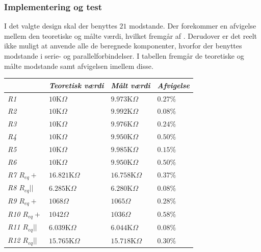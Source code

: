 \subsubsection{Implementering og test}
I det valgte design skal der benyttes $21$ modstande. Der forekommer en afvigelse mellem den teoretiske og målte værdi, hvilket fremgår af . Derudover er det reelt ikke muligt at anvende alle de beregnede komponenter, hvorfor der benyttes modstande i serie- og parallelforbindelser. I tabellen fremgår de teoretiske og målte modstande samt afvigelsen imellem disse. 
\begin{table}[H]
\centering
\begin{tabular}{|l|l|l|l|}
\cline{2-4} \multicolumn{1}{l|}{}     & \textit{Teoretisk værdi} & \textit{Målt værdi} & \textit{Afvigelse} \\ \hline
\textit{R1}             & $10$K$\Omega$            & $9.973$K$\Omega$    & $0.27\%$           \\ \hline
\textit{R2}             & $10$K$\Omega$            & $9.992$K$\Omega$    & $0.08\%$           \\ \hline
\textit{R3}             & $10$K$\Omega$            & $9.976$K$\Omega$    & $0.24\%$           \\ \hline
\textit{R4}             & $10$K$\Omega$            & $9.950$K$\Omega$    & $0.50\%$           \\ \hline
\textit{R5}             & $10$K$\Omega$            & $9.985$K$\Omega$    & $0.15\%$           \\ \hline
\textit{R6}             & $10$K$\Omega$            & $9.950$K$\Omega$    & $0.50\%$           \\ \hline
\textit{R7 $R_{eq}+$}     & $16.821$K$\Omega$        & $16.758$K$\Omega$   & $0.37\%$           \\ \hline
\textit{R8 $R_{eq}||$}  & $6.285$K$\Omega$         & $6.280$K$\Omega$    & $0.08\%$           \\ \hline
\textit{R9 $R_{eq}+$}     & $1068\Omega$             & $1065\Omega$        & $0.28\%$           \\ \hline
\textit{R10 $R_{eq}+$}    & $1042\Omega$             & $1036\Omega$        & $0.58\%$           \\ \hline
\textit{R11 $R_{eq}||$} & $6.039$K$\Omega$         & $6.044$K$\Omega$    & $0.08\%$           \\ \hline
\textit{R12 $R_{eq}||$} & $15.765$K$\Omega$        & $15.718$K$\Omega$   & $0.30\%$           \\ \hline

\end{tabular}
\end{table}
